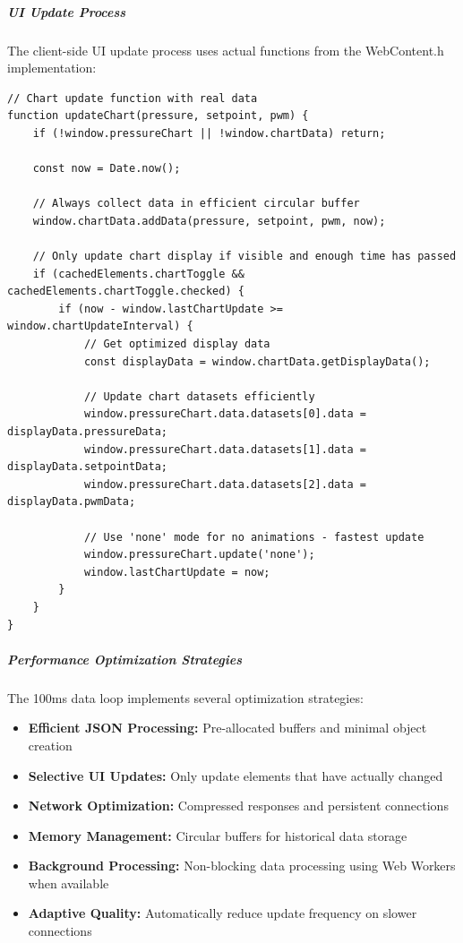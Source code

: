 \subparagraph{UI Update Process}
The client-side UI update process uses actual functions from the WebContent.h implementation:

\begin{lstlisting}[caption=Actual UI Update Functions from WebContent.h]
// Chart update function with real data
function updateChart(pressure, setpoint, pwm) {
    if (!window.pressureChart || !window.chartData) return;
    
    const now = Date.now();
    
    // Always collect data in efficient circular buffer
    window.chartData.addData(pressure, setpoint, pwm, now);
    
    // Only update chart display if visible and enough time has passed
    if (cachedElements.chartToggle && cachedElements.chartToggle.checked) {
        if (now - window.lastChartUpdate >= window.chartUpdateInterval) {
            // Get optimized display data
            const displayData = window.chartData.getDisplayData();
            
            // Update chart datasets efficiently
            window.pressureChart.data.datasets[0].data = displayData.pressureData;
            window.pressureChart.data.datasets[1].data = displayData.setpointData;
            window.pressureChart.data.datasets[2].data = displayData.pwmData;
            
            // Use 'none' mode for no animations - fastest update
            window.pressureChart.update('none');
            window.lastChartUpdate = now;
        }
    }
}
\end{lstlisting}


\subparagraph{Performance Optimization Strategies}
The 100ms data loop implements several optimization strategies:

\begin{itemize}
    \item \textbf{Efficient JSON Processing:} Pre-allocated buffers and minimal object creation
    \item \textbf{Selective UI Updates:} Only update elements that have actually changed
    \item \textbf{Network Optimization:} Compressed responses and persistent connections
    \item \textbf{Memory Management:} Circular buffers for historical data storage
    \item \textbf{Background Processing:} Non-blocking data processing using Web Workers when available
    \item \textbf{Adaptive Quality:} Automatically reduce update frequency on slower connections
\end{itemize}

